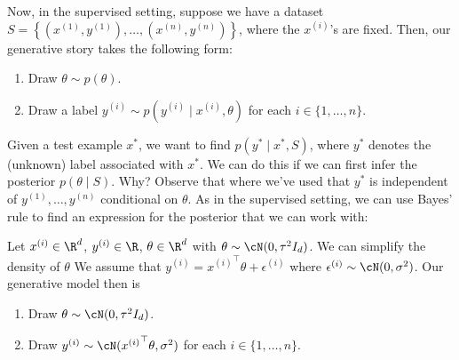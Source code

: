 Now, in the supervised setting, suppose we have a dataset $S = \left\{\left(x^{(1)}, y^{(1)}\right), \dots, \left(x^{(n)}, y^{(n)}\right)\right\}$, where the $x^{(i)}$'s are fixed. Then, our generative story takes the following form: 
\begin{enumerate}
    \item Draw $\theta \sim p(\theta)$.
    \item Draw a label $y^{(i)} \sim p\left(y^{(i)} \mid x^{(i)}, \theta\right)$ for each $i \in \{1, \dots, n\}$.
\end{enumerate}
Given a test example $x^*$, we want to find $p(y^* \mid x^*, S)$, where $y^*$ denotes the (unknown) label associated with $x^*$. We can do this if we can first infer the posterior $p(\theta \mid S)$. Why? Observe that
where we've used that $y^*$ is independent of $y^{(1)}, \dots, y^{(n)}$ conditional on $\theta$. As in the supervised setting, we can use Bayes' rule to find an expression for the posterior that we can work with:

Let $x^{(i)} \in \R^d$, $y^{(i)} \in \R$, $\theta \in \R^d$ with $\theta \sim \cN(0, \tau^2 I_d)$. We can simplify the density of $\theta$ 
We assume that $y^{(i)} = {x^{(i)}}^\top \theta + \epsilon^{(i)}$ where $\epsilon^{(i)} \sim \cN(0, \sigma^2)$. Our generative model then is 
\begin{enumerate}
    \item Draw $\theta \sim \cN(0, \tau^2 I_d)$.
    \item Draw $y^{(i)} \sim \cN({x^{(i)}}^\top \theta, \sigma^2)$ for each $i \in \{1, \dots, n\}$.
\end{enumerate}

